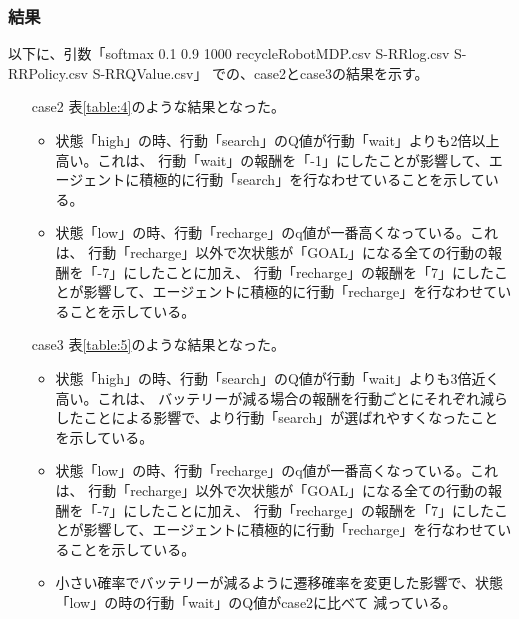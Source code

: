 \subsubsection{結果}
以下に、引数「softmax 0.1 0.9 1000 recycleRobotMDP.csv S-RRlog.csv S-RRPolicy.csv S-RRQValue.csv」
での、case2とcase3の結果を示す。
\begin{itemize}
  \item[case2] 表\ref{table:4}のような結果となった。
  \begin{itemize}
    \item 状態「high」の時、行動「search」のQ値が行動「wait」よりも2倍以上高い。これは、
    行動「wait」の報酬を「-1」にしたことが影響して、エージェントに積極的に行動「search」を行なわせていることを示している。
    \item 状態「low」の時、行動「recharge」のq値が一番高くなっている。これは、
    行動「recharge」以外で次状態が「GOAL」になる全ての行動の報酬を「-7」にしたことに加え、
    行動「recharge」の報酬を「7」にしたことが影響して、エージェントに積極的に行動「recharge」を行なわせていることを示している。
  \end{itemize}
  \item[case3] 表\ref{table:5}のような結果となった。
  \begin{itemize}
    \item 状態「high」の時、行動「search」のQ値が行動「wait」よりも3倍近く高い。これは、
    バッテリーが減る場合の報酬を行動ごとにそれぞれ減らしたことによる影響で、より行動「search」が選ばれやすくなったことを示している。
    \item 状態「low」の時、行動「recharge」のq値が一番高くなっている。これは、
    行動「recharge」以外で次状態が「GOAL」になる全ての行動の報酬を「-7」にしたことに加え、
    行動「recharge」の報酬を「7」にしたことが影響して、エージェントに積極的に行動「recharge」を行なわせていることを示している。
    \item 小さい確率でバッテリーが減るように遷移確率を変更した影響で、状態「low」の時の行動「wait」のQ値がcase2に比べて
    減っている。
  \end{itemize}
\end{itemize}
\clearpage
